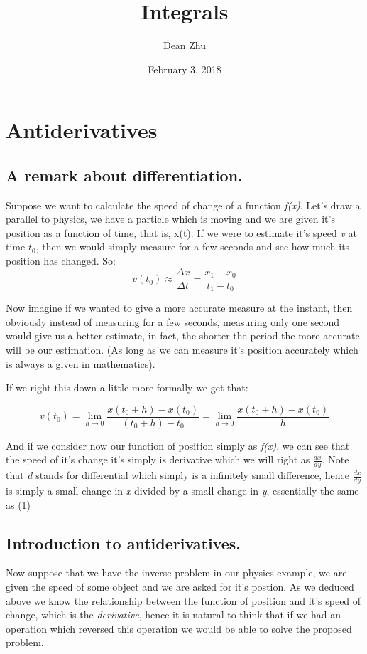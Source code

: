 \documentclass[11pt]{article}
\date{February 3, 2018}
\title{Integrals}
\author{Dean Zhu}
\begin{document}
\maketitle
\section{Antiderivatives}
\label{sec:orgbf18620}

\subsection{A remark about differentiation.}
\label{sec:orgac82feb}

Suppose we want to calculate the speed of change of a function \emph{f(x)}. Let's draw
a parallel to physics, we have a particle which is moving and we are given it's
position as a function of time, that is, x(t). If we were to estimate it's speed
\emph{v} at time \(t_{0}\), then we would simply measure for a few seconds and see how much
its position has changed. So: \[ v(t_{0}) \approx \frac{\Delta x}{\Delta t} =
\frac{x_{1} - x_{0}}{t_{1} - t_{0}} \]

Now imagine if we wanted to give a more accurate measure at the instant, then
obviously instead of measuring for a few seconds, measuring only one second
would give us a better estimate, in fact, the shorter the period the more
accurate will be our estimation. (As long as we can measure it's position
accurately which is always a given in mathematics).

If we right this down a little more formally we get that: 

\begin{equation}
v(t_0) =
 \lim_{h\rightarrow 0} \frac{x(t_{0}+h) - x(t_0)}{(t_{0} + h) - t_{0}} = \lim_{h\rightarrow 0}
 \frac{x(t_{0}+h) - x(t_0)}{h}
\end{equation}

And if we consider now our function of position simply as \emph{f(x)}, we can see
that the speed of it's change it's simply is derivative which we will right as
\(\frac{dx}{dy}\). Note that \emph{d} stands for differential which
simply is a infinitely small difference, hence \(\frac{dx}{dy}\) is simply a
small change in \emph{x} divided by a small change in \emph{y}, essentially the same as
(1)

\subsection{Introduction to antiderivatives.}
\label{sec:org2a549b4}
Now suppose that we have the inverse problem in our physics example, we are
given the speed of some object and we are asked for it's postion. As we deduced
above we know the relationship between the function of position and it's speed
of change, which is the \emph{derivative}, hence it is natural to think that if we
had an operation which reversed this operation we would be able to solve the
proposed problem.
\end{document}
